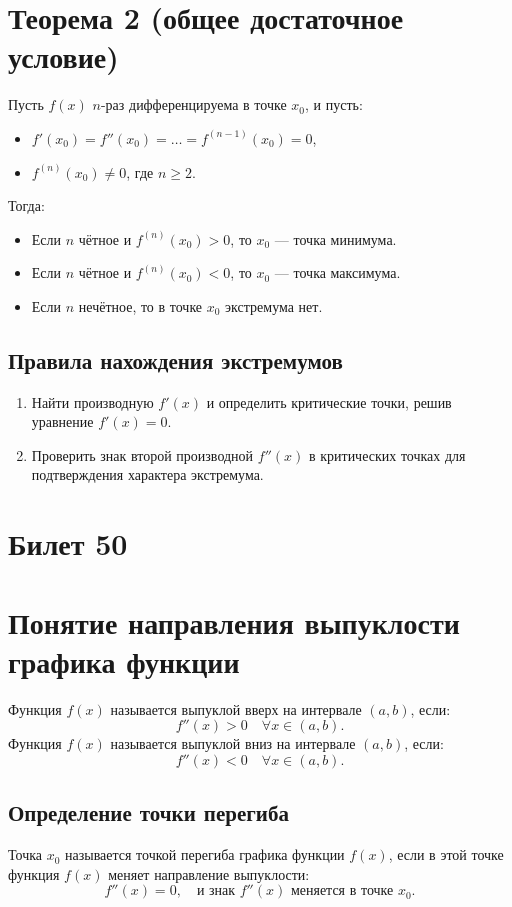 \documentclass{article}
\begin{document}
\section*{Теорема 2 (общее достаточное условие)}
Пусть \( f(x) \) \( n \)-раз дифференцируема в точке \( x_0 \), и пусть:
\begin{itemize}
    \item \( f'(x_0) = f''(x_0) = \dots = f^{(n-1)}(x_0) = 0 \),
    \item \( f^{(n)}(x_0) \neq 0 \), где \( n \geq 2 \).
\end{itemize}
Тогда:
\begin{itemize}
    \item Если \( n \) чётное и \( f^{(n)}(x_0) > 0 \), то \( x_0 \) — точка минимума.
    \item Если \( n \) чётное и \( f^{(n)}(x_0) < 0 \), то \( x_0 \) — точка максимума.
    \item Если \( n \) нечётное, то в точке \( x_0 \) экстремума нет.
\end{itemize}

\subsection*{Правила нахождения экстремумов}
\begin{enumerate}
    \item Найти производную \( f'(x) \) и определить критические точки, решив уравнение \( f'(x) = 0 \).
    \item Проверить знак второй производной \( f''(x) \) в критических точках для подтверждения характера экстремума.
\end{enumerate}

\section{Билет 50}

\section*{Понятие направления выпуклости графика функции}
Функция \( f(x) \) называется выпуклой вверх на интервале \( (a, b) \), если:
\[
f''(x) > 0 \quad \forall x \in (a, b).
\]
Функция \( f(x) \) называется выпуклой вниз на интервале \( (a, b) \), если:
\[
f''(x) < 0 \quad \forall x \in (a, b).
\]

\subsection*{Определение точки перегиба}
Точка \( x_0 \) называется точкой перегиба графика функции \( f(x) \), если в этой точке функция \( f(x) \) меняет направление выпуклости:
\[
f''(x) = 0, \quad \text{и знак } f''(x) \text{ меняется в точке } x_0.
\]
\end{document}
